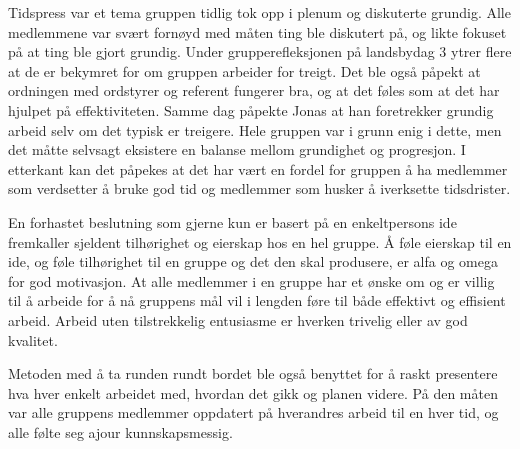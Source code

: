 

Tidspress var et tema gruppen tidlig tok opp i plenum og diskuterte grundig.
Alle medlemmene var svært fornøyd med måten ting ble diskutert på, og likte fokuset på at ting ble gjort grundig.
Under grupperefleksjonen på landsbydag 3 ytrer flere at de er bekymret for om gruppen arbeider for treigt.
Det ble også påpekt at ordningen med ordstyrer og referent fungerer bra, og at det føles som at det har hjulpet på effektiviteten.
Samme dag påpekte Jonas at han foretrekker grundig arbeid selv om det typisk er treigere.
Hele gruppen var i grunn enig i dette, men det måtte selvsagt eksistere en balanse mellom grundighet og progresjon.
I etterkant kan det påpekes at det har vært en fordel for gruppen å ha medlemmer som verdsetter å bruke god tid og medlemmer som husker å iverksette tidsdrister.
 
En forhastet beslutning som gjerne kun er basert på en enkeltpersons ide fremkaller sjeldent tilhørighet og eierskap hos en hel gruppe.
Å føle eierskap til en ide, og føle tilhørighet til en gruppe og det den skal produsere, er alfa og omega for god motivasjon.
At alle medlemmer i en gruppe har et ønske om og er villig til å arbeide for å nå gruppens mål vil i lengden føre til både effektivt og effisient arbeid.
Arbeid uten tilstrekkelig entusiasme er hverken trivelig eller av god kvalitet.





Metoden med å ta runden rundt bordet ble også benyttet for å raskt presentere hva hver enkelt arbeidet med, hvordan det gikk og planen videre.
På den måten var alle gruppens medlemmer oppdatert på hverandres arbeid til en hver tid, og alle følte seg ajour kunnskapsmessig.



%


























